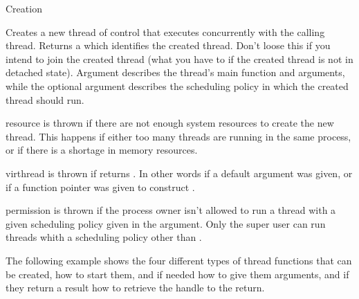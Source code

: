 \begin{manpage}{Creation}
\begin{mandescription}
  Creates a new thread of control that executes concurrently with the
  calling thread. Returns a  which identifies the
  created thread. Don't loose this  if you intend to
  join the created thread (what you have to if the created thread is
  not in detached state). Argument  describes the thread's
  main function and arguments, while the optional argument
   describes the scheduling policy
  in which the created thread should run.
  \begin{exception}
    \item[resource] is thrown if there are
      not enough system resources to create the new thread. This
      happens if either too many threads are running in the same
      process, or if there is a shortage in memory resources.
    \item[virthread] is thrown if
       returns . In other words
      if a default  argument was given, or if a
       function pointer was given to construct
      .
    \item[permission] is thrown if the
      process owner isn't allowed to run a thread with a given
      scheduling policy given in the  argument. Only
      the super user can run threads whith a scheduling policy other
      than .
  \end{exception}
\end{mandescription}

The following example shows the four different types of thread
functions that can be created, how to start them, and if needed how to
give them arguments, and if they return a result how to retrieve the
handle to the return.


\renewcommand{\manlayout}{\savedmanlayout}
\end{manpage}



